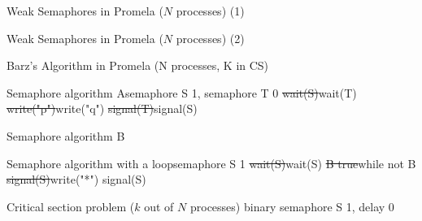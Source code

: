 \begin{wideslide}[bm=,toc=]{\large Weak Semaphores in Promela ($N$ processes) (1)}
\end{wideslide}

\begin{wideslide}[bm=,toc=]{\large Weak Semaphores in Promela ($N$ processes) (2)}
\end{wideslide}

\begin{wideslide}[bm=,toc=]{\normalsize Barz's Algorithm in Promela (N processes, K in CS)}
\end{wideslide}

\begin{wideslide}[bm=,toc=]{\large }
\begin{alg}{Semaphore algorithm A}{semaphore S \la{} 1, semaphore T \la{} 0}\hline
{}
\st{wait(S)}{wait(T)}
\st{write("p")}{write("q")}
\st{signal(T)}{signal(S)}
\end{alg}
\end{wideslide}

\begin{wideslide}[bm=,toc=]{\large }
\begin{algthree}{Semaphore algorithm B}
\hline
{}
\end{algthree}
\end{wideslide}

\begin{wideslide}[bm=,toc=]{\large }
\begin{alg}{Semaphore algorithm with a loop}{semaphore S \la{} 1}
\hline
{}
\st{wait(S)}{wait(S)}
\st{B \la{} true}{while not B}
\st{signal(S)}{\idt{}write("*")}
\st{}{signal(S)}
\end{alg}
\end{wideslide}

\begin{wideslide}[bm=,toc=]{\large }
\begin{alg}{Critical section problem ($k$ out of $N$ processes)}%
{binary semaphore S \la{} 1, delay \la{} 0}
\hline
\hline
{}
\end{alg}
\end{wideslide}

